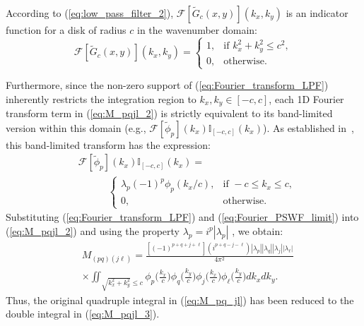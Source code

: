 \documentclass[lettersize,journal]{IEEEtran}
\theoremstyle{plain}
\begin{document}
According to (\ref{eq:low_pass_filter_2}), $\mathcal{F}[\tilde{G}_c(x,y)](k_x, k_y)$ is an indicator function for a disk of radius $c$ in the wavenumber domain:
\begin{equation}
	\mathcal{F}[\tilde{G}_c(x,y)](k_x, k_y) = 
		\begin{cases} 
			1, & \text{if } k_x^2 + k_y^2 \leq c^2, \\ 
			0, & \text{otherwise}. 
		\end{cases}
		\label{eq:Fourier_transform_LPF}
\end{equation}

Furthermore, since the non-zero support of (\ref{eq:Fourier_transform_LPF}) inherently restricts the integration region to $k_x, k_y \in [-c, c]$, each 1D Fourier transform term in (\ref{eq:M_pqjl_2}) is strictly equivalent to its band-limited version within this domain (e.g., $\mathcal{F}[\tilde{\phi}_p](k_x)\mathbb{I}_{[-c, c]}(k_x)$).
As established in~\cite{osipov2013prolate}, this band-limited transform has the expression:
\begin{equation}
	\begin{aligned}
		&\mathcal{F}[\tilde{\phi}_p](k_x)\mathbb{I}_{[-c,c]}(k_x) = \\ &\qquad\quad
		\begin{cases} \lambda_p(-1)^p\phi_p(k_x/c), & \text{if } -c \leq k_x \leq c, \\ 
		0, & \text{otherwise}. \end{cases}
	\end{aligned}
	\label{eq:Fourier_PSWF_limit}
\end{equation}
Substituting (\ref{eq:Fourier_transform_LPF}) and (\ref{eq:Fourier_PSWF_limit}) into (\ref{eq:M_pqjl_2}) and using the property $\lambda_p = i^{p}|\lambda_p|$ \cite{osipov2013prolate}, we obtain:
\begin{align}
	&M_{(pq)(j\ell)} = \frac{\left[(-1)^{p+q+j+\ell}\right]\left(i^{p+q-j-\ell}\right)|\lambda_p||\lambda_q||\lambda_j||\lambda_\ell|}{4\pi^2} \nonumber \\
	&\times \iint_{\sqrt{k_x^2 + k_y^2} \leq c}\phi_p\Big(\frac{k_x}{c}\Big)\phi_q\Big(\frac{k_y}{c}\Big)\phi_j\Big(\frac{k_x}{c}\Big)\phi_\ell\Big(\frac{k_y}{c}\Big)dk_xdk_y .
	\label{eq:M_pqjl_3}
\end{align}
Thus, the original quadruple integral in (\ref{eq:M_pq_jl}) has been reduced to the double integral in (\ref{eq:M_pqjl_3}).
	
\end{document}
